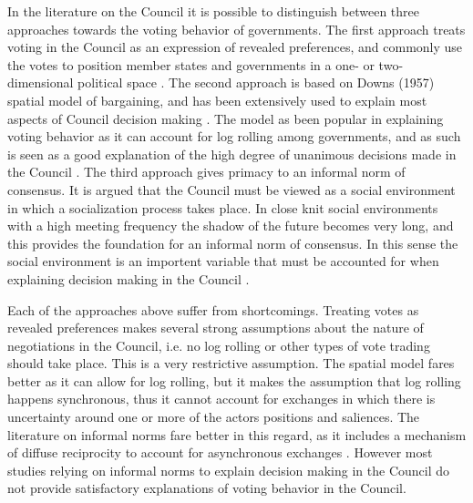 In the literature on the Council it is possible to distinguish between three approaches towards the voting behavior of governments. The first approach treats voting in the Council as an expression of revealed preferences, and commonly use the votes to position member states and governments in a one- or two-dimensional political space \citep{Hagemann2007,Hagemann2008,Mattila2009}. The second approach is based on Downs (1957) spatial model of bargaining, and has been extensively used to explain most aspects of Council decision making \citep{Thomson2006a}. The model as been popular in explaining voting behavior as it can account for log rolling among governments, and as such is seen as a good explanation of the high degree of unanimous decisions made in the Council \citep{MattilaLane2001,KonigJunge2009}. The third approach gives primacy to an informal norm of consensus. It is argued that the Council must be viewed as a social environment in which a socialization process takes place. In close knit social environments with a high meeting frequency the shadow of the future becomes very long, and this provides the foundation for an informal norm of consensus. In this sense the social environment is an importent variable that must be accounted for when explaining decision making in the Council \citep{Johnston2001,Heisenberg2005}. 

Each of the approaches above suffer from shortcomings. Treating votes as revealed preferences makes several strong assumptions about the nature of negotiations in the Council, i.e. no log rolling or other types of vote trading should take place. This is a very restrictive assumption. The spatial model fares better as it can allow for log rolling, but it makes the assumption that log rolling happens synchronous, thus it cannot account for exchanges in which there is uncertainty around one or more of the actors positions and saliences. The literature on informal norms fare better in this regard, as it includes a mechanism of diffuse reciprocity to account for asynchronous exchanges \citep{Jonsson2000,Lewis2000}. However most studies relying on informal norms to explain decision making in the Council do not provide satisfactory explanations of voting behavior in the Council. 


